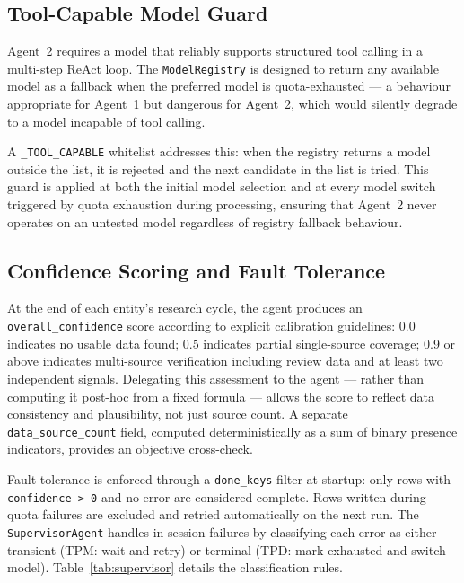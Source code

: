 \subsection{Tool-Capable Model Guard}

Agent~2 requires a model that reliably supports structured tool calling in a
multi-step ReAct loop. The \texttt{ModelRegistry} is designed to return any available
model as a fallback when the preferred model is quota-exhausted — a behaviour
appropriate for Agent~1 but dangerous for Agent~2, which would silently degrade
to a model incapable of tool calling.

A \texttt{\_TOOL\_CAPABLE} whitelist addresses this: when the registry returns a
model outside the list, it is rejected and the next candidate in the list is tried.
This guard is applied at both the initial model selection and at every model switch
triggered by quota exhaustion during processing, ensuring that Agent~2 never operates
on an untested model regardless of registry fallback behaviour.

\subsection{Confidence Scoring and Fault Tolerance}

At the end of each entity's research cycle, the agent produces an
\texttt{overall\_confidence} score according to explicit calibration guidelines:
0.0 indicates no usable data found; 0.5 indicates partial single-source coverage;
0.9 or above indicates multi-source verification including review data and at least
two independent signals. Delegating this assessment to the agent — rather than
computing it post-hoc from a fixed formula — allows the score to reflect data
consistency and plausibility, not just source count. A separate
\texttt{data\_source\_count} field, computed deterministically as a sum of binary
presence indicators, provides an objective cross-check.

Fault tolerance is enforced through a \texttt{done\_keys} filter at startup: only
rows with \texttt{confidence > 0} and no error are considered complete. Rows written
during quota failures are excluded and retried automatically on the next run.
The \texttt{SupervisorAgent} handles in-session failures by classifying each error
as either transient (TPM: wait and retry) or terminal (TPD: mark exhausted and
switch model). Table~\ref{tab:supervisor} details the classification rules.

